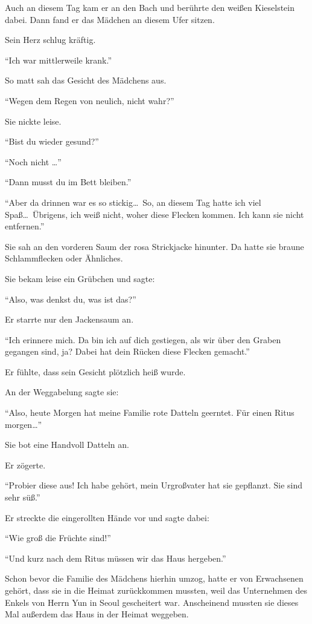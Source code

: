 \documentclass[prd,a4paper,12pt,tightenlines,notitlepage,nofootinbib]{revtex4-1}
\begin{document}
Auch an diesem Tag kam er an den Bach und berührte
den weißen Kieselstein dabei.
Dann fand er das Mädchen an diesem Ufer sitzen.

Sein Herz schlug kräftig.

"`Ich war mittlerweile krank."'

So matt sah das Gesicht des Mädchens aus.

"`Wegen dem Regen von neulich, nicht wahr?"'

Sie nickte leise.

"`Bist du wieder gesund?"'

"`Noch nicht \ldots"'

"`Dann musst du im Bett bleiben."'

"`Aber da drinnen war es so stickig\ldots\
So, an diesem Tag hatte ich viel Spaß\ldots\
Übrigens, ich weiß nicht, woher diese Flecken kommen.
Ich kann sie nicht entfernen."'

Sie sah an den vorderen Saum der rosa Strickjacke hinunter.
Da hatte sie braune Schlammflecken oder Ähnliches.

Sie bekam leise ein Grübchen und sagte:

"`Also, was denkst du, was ist das?"'

Er starrte nur den Jackensaum an.

"`Ich erinnere mich.
Da bin ich auf dich gestiegen,
als wir über den Graben gegangen sind, ja?
Dabei hat dein Rücken diese Flecken gemacht."'

Er fühlte, dass sein Gesicht plötzlich heiß wurde.

An der Weggabelung sagte sie:

"`Also, heute Morgen hat meine Familie rote Datteln geerntet.
Für einen Ritus morgen\ldots"'

Sie bot eine Handvoll Datteln an.

Er zögerte.

"`Probier diese aus!
Ich habe gehört, mein Urgroßvater hat sie gepflanzt.
Sie sind sehr süß."'

Er streckte die eingerollten Hände vor und sagte dabei:

"`Wie groß die Früchte sind!"'

"`Und kurz nach dem Ritus müssen wir das Haus hergeben."'

Schon bevor die Familie des Mädchens hierhin umzog,
hatte er von Erwachsenen gehört,
dass sie in die Heimat zurückkommen mussten,
weil das Unternehmen des Enkels von Herrn Yun in Seoul gescheitert war.
Anscheinend mussten sie dieses Mal außerdem das Haus in der Heimat weggeben.
\end{document}
